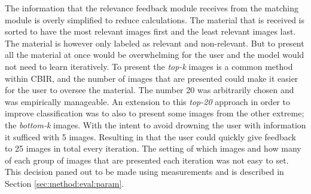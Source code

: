 The information that the relevance feedback module receives from the matching module is overly simplified to reduce calculations. The material that is received is sorted to have the most relevant images first and the least relevant images last. The material is however only labeled as relevant and non-relevant. But to present all the material at once would be overwhelming for the user and the model would not need to learn iteratively. 
To present the \emph{top-k} images is a common method within CBIR, and the number of images that are presented could make it easier for the user to oversee the material. The number 20 was arbitrarily chosen and was empirically manageable. An extension to this \emph{top-20} approach in order to improve classification was to also to present some images from the other extreme; the \emph{bottom-k} images. With the intent to avoid drowning the user with information it sufficed with 5 images. Resulting in that the user could quickly give feedback to 25 images in total every iteration. The setting of which images and how many of each group of images that are presented each iteration was not easy to set. This decision paned out to be  made using measurements and is described in Section \ref{sec:method:eval:param}. 
